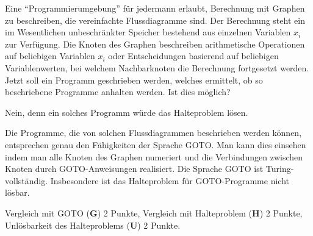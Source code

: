 Eine ``Programmierumgebung'' für jedermann erlaubt, Berechnung mit
Graphen zu beschreiben, die vereinfachte Flussdiagramme sind.
Der Berechnung steht ein im Wesentlichen unbeschränkter Speicher
bestehend aus einzelnen Variablen $x_i$
zur Verfügung.
Die Knoten des Graphen beschreiben arithmetische Operationen auf beliebigen
Variablen $x_i$ oder Entscheidungen basierend auf beliebigen Variablenwerten,
bei welchem Nachbarknoten die Berechnung fortgesetzt werden.
Jetzt soll ein Programm geschrieben werden, welches ermittelt,
ob so beschriebene Programme anhalten werden.
Ist dies möglich?


\begin{loesung}
Nein, denn ein solches Programm  würde das Halteproblem lösen.

Die Programme, die von solchen Flussdiagrammen beschrieben werden
können, entsprechen genau den Fähigkeiten der Sprache GOTO.
Man kann dies einsehen indem man alle Knoten des Graphen numeriert und
die Verbindungen zwischen Knoten durch GOTO-Anweisungen realisiert.
Die Sprache GOTO ist Turing-vollständig.
Insbesondere ist das Halteproblem für GOTO-Programme nicht lösbar.
\end{loesung}

\begin{bewertung}
Vergleich mit GOTO ({\bf G}) 2 Punkte,
Vergleich mit Halteproblem ({\bf H}) 2 Punkte,
Unlösbarkeit des Halteproblems ({\bf U}) 2 Punkte.
\end{bewertung}




